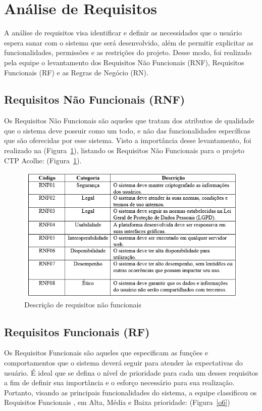 \documentclass[12pt,a4paper]{article}
\begin{document}
\section{Análise de Requisitos}
A análise de requisitos visa identificar e definir as necessidades que o usuário espera sanar com o sistema que será desenvolvido, além de permitir explicitar as funcionalidades, permissões e as restrições do projeto. Desse modo, foi realizado pela equipe o levantamento dos Requisitos Não Funcionais (RNF), Requisitos Funcionais (RF) e as Regras de Negócio (RN). \cite{vverner, mestres, artigoo} 

\subsection{Requisitos Não Funcionais (RNF)}
Os Requisitos Não Funcionais são aqueles que tratam dos atributos de qualidade que o sistema deve possuir como um todo, e não das funcionalidades específicas que são oferecidas por esse sistema. Visto a importância desse levantamento, foi realizado na (Figura~\ref{fig05}), listando os Requisitos Não Funcionais para o projeto CTP Acolhe: (Figura~\ref{fig05}). \cite{artigo, blog, codificar}

\newpage 

\begin{figure}[H]
    \centering
     \includegraphics[width=15cm]{img5.png}
    \caption{Descrição de requisitos não funcionais}
    \label{fig05}
\end{figure}

\subsection{Requisitos Funcionais (RF)}
Os Requisitos Funcionais são aqueles que especificam as funções e comportamentos que o sistema deverá seguir para atender às expectativas do usuário. É ideal que se defina o nível de prioridade para cada um desses requisitos a fim de definir sua importância e o esforço necessário para sua realização. Portanto, visando as principais funcionalidades do sistema, a equipe classificou os Requisitos Funcionais \cite{codificar}, em Alta, Média e Baixa prioridade: (Figura~\ref{o6})
\end{document}
